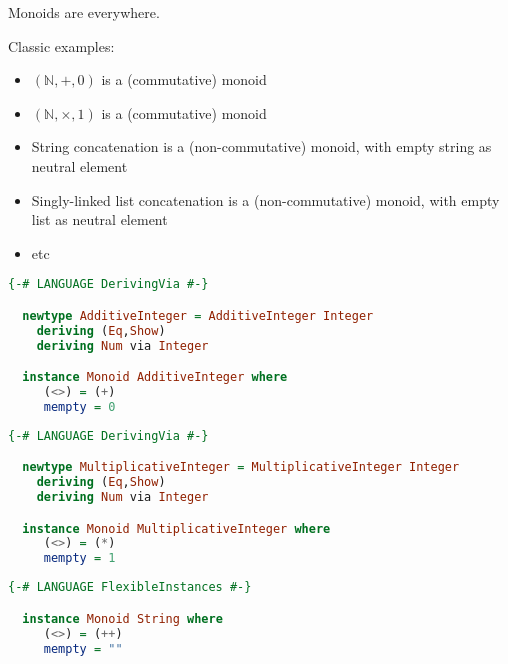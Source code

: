 \documentclass[10pt]{beamer}
\providecommand{\N}{\mathbb{N}}
\begin{document}
\begin{frame}
  Monoids are everywhere.

  Classic examples:
  \begin{itemize}
    \item $(\N, +, 0)$ is a (commutative) monoid
    \item $(\N, \times , 1)$ is a (commutative) monoid
    \item String concatenation is a (non-commutative) monoid, with empty string as neutral element
    \item Singly-linked list concatenation is a (non-commutative) monoid, with empty list as neutral element
    \item etc
  \end{itemize}
\end{frame}


\begin{frame}[fragile]
  \begin{lstlisting}[language=haskell]
  {-# LANGUAGE DerivingVia #-}

  newtype AdditiveInteger = AdditiveInteger Integer
    deriving (Eq,Show)
    deriving Num via Integer

  instance Monoid AdditiveInteger where
     (<>) = (+)
     mempty = 0
  \end{lstlisting}
\end{frame}
\begin{frame}[fragile]
  \begin{lstlisting}[language=haskell]
  {-# LANGUAGE DerivingVia #-}

  newtype MultiplicativeInteger = MultiplicativeInteger Integer
    deriving (Eq,Show)
    deriving Num via Integer

  instance Monoid MultiplicativeInteger where
     (<>) = (*)
     mempty = 1
  \end{lstlisting}
\end{frame}

\begin{frame}[fragile]
  \begin{lstlisting}[language=haskell]
  {-# LANGUAGE FlexibleInstances #-}

  instance Monoid String where
     (<>) = (++)
     mempty = ""
  \end{lstlisting}
\end{frame}
\end{document}
